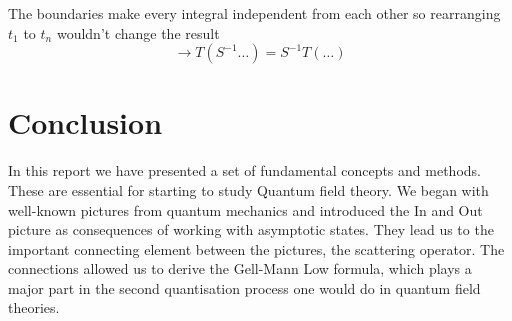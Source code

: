 \documentclass[12pt, titlepage]{article}
\begin{document}
The boundaries make every integral independent from each other so rearranging 
$ t_{1} $  to $ t_n $ wouldn't change the result 
\[
\rightarrow T(S^{-1} \ldots)=S^{-1} T(\ldots)
\]
%
\newpage
\section{Conclusion}
In this report we have presented a set of fundamental concepts and methods. These are essential for starting to study Quantum field theory. We began with well-known pictures from quantum mechanics and introduced the In and Out picture as consequences of working with asymptotic states. They lead us to the important connecting element between the pictures, the scattering operator. The connections allowed us to derive the Gell-Mann Low formula, which plays a major part in the second quantisation process one would do in quantum field theories. 
\newpage
\end{document}
